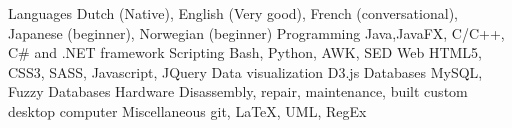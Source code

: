 \begin{cvskills}
  \cvskill
    {Languages}
    {Dutch (Native), English (Very good), French (conversational), Japanese (beginner), Norwegian (beginner) }
  \cvskill
    {Programming}
    {Java,JavaFX, C/C++, C\# and .NET framework}
  \cvskill
    {Scripting}
    {Bash, Python, AWK, SED}
  \cvskill
    {Web}
    {HTML5, CSS3, SASS, Javascript, JQuery}
  \cvskill
    {Data visualization}
    {D3.js}
  \cvskill
    {Databases}
    {MySQL, Fuzzy Databases}
  \cvskill
    {Hardware}
    {Disassembly, repair, maintenance, built custom desktop computer}
  \cvskill
    {Miscellaneous}
    {git, \LaTeX, UML, RegEx}
\end{cvskills}
